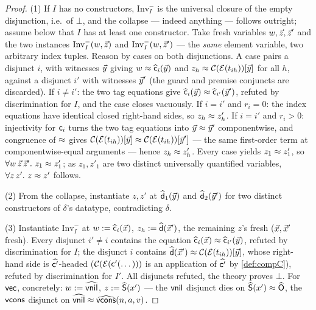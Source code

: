 \begin{proof}
(1) If $I$ has no constructors, $\mathrm{Inv}^-_I$ is the universal
closure of the empty disjunction, i.e.\ of $\bot$, and the collapse
--- indeed anything --- follows outright; assume below that $I$ has at
least one constructor.  Take fresh variables $w, \vec{z}, \vec{z}'$
and the two instances $\mathrm{Inv}^-_I(w, \vec{z})$ and
$\mathrm{Inv}^-_I(w, \vec{z}')$ --- the \emph{same} element variable,
two arbitrary index tuples.  Reason by cases on both disjunctions.  A case pairs a disjunct $i$, with
witnesses $\vec{y}$ giving $w \approx \widehat{\mathsf{c}}_i(\vec{y})$ and
$z_h \approx \mathcal{C}(\mathcal{E}(t_{ih}))[\vec{y}]$ for all $h$, against a
disjunct $i'$ with witnesses $\vec{y}'$ (the guard and premise
conjuncts are discarded).  If $i \neq i'$: the two tag equations give
$\widehat{\mathsf{c}}_i(\vec{y}) \approx \widehat{\mathsf{c}}_{i'}(\vec{y}')$,
refuted by discrimination for $I$, and the case closes vacuously.  If
$i = i'$ and $r_i = 0$: the index equations have identical closed
right-hand sides, so $z_h \approx z'_h$.  If $i = i'$ and $r_i > 0$:
injectivity for $\mathsf{c}_i$ turns the two tag equations into $\vec{y}
\approx \vec{y}'$ componentwise, and congruence of $\approx$ gives
$\mathcal{C}(\mathcal{E}(t_{ih}))[\vec{y}] \approx
\mathcal{C}(\mathcal{E}(t_{ih}))[\vec{y}']$ --- the same first-order term at
componentwise-equal arguments --- hence $z_h \approx z'_h$.  Every case
yields $z_1 \approx z'_1$, so $\forall w\,\vec{z}\,\vec{z}'.\ z_1 \approx
z'_1$; as $z_1, z'_1$ are two distinct universally quantified
variables, $\forall z\,z'.\ z \approx z'$ follows.

(2) From the collapse, instantiate $z, z'$ at
$\widehat{\mathsf{d}}_1(\vec{y})$ and $\widehat{\mathsf{d}}_2(\vec{y}')$ for two
distinct constructors of $\delta$'s datatype, contradicting $\delta$.

(3) Instantiate $\mathrm{Inv}^-_I$ at $w \mathrel{:=}
\widehat{\mathsf{c}}_i(\vec{x})$, $z_h \mathrel{:=} \widehat{\mathsf{d}}(\vec{x}')$,
the remaining $z$'s fresh ($\vec{x}, \vec{x}'$ fresh).  Every disjunct
$i' \neq i$ contains the equation
$\widehat{\mathsf{c}}_i(\vec{x}) \approx \widehat{\mathsf{c}}_{i'}(\vec{y})$,
refuted by discrimination for $I$; the disjunct $i$ contains
$\widehat{\mathsf{d}}(\vec{x}') \approx \mathcal{C}(\mathcal{E}(t_{ih}))[\vec{y}]$, whose
right-hand side is $\widehat{\mathsf{c}'}$-headed
($\mathcal{C}(\mathcal{E}(\mathsf{c}'(\dots)))$ is an application of
$\widehat{\mathsf{c}'}$ by \cref{def:compC}), refuted by discrimination for
$I'$.  All disjuncts refuted, the theory proves $\bot$.
For $\mathsf{vec}$, concretely: $w \mathrel{:=} \widehat{\mathsf{vnil}}$, $z \mathrel{:=}
\widehat{\mathsf{S}}(x')$ --- the $\mathsf{vnil}$ disjunct dies on $\widehat{\mathsf{S}}(x')
\approx \widehat{\mathsf{O}}$, the $\mathsf{vcons}$ disjunct on $\widehat{\mathsf{vnil}} \approx
\widehat{\mathsf{vcons}}(n,a,v)$.
\end{proof}

